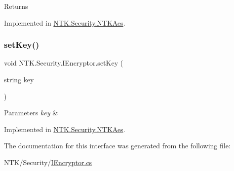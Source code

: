 \begin{DoxyReturn}{Returns}

\end{DoxyReturn}


Implemented in \mbox{\hyperlink{class_n_t_k_1_1_security_1_1_n_t_k_aes_a19ffab44349e954e69e9eb1831c9ceae}{N\+T\+K.\+Security.\+N\+T\+K\+Aes}}.

\mbox{\label{interface_n_t_k_1_1_security_1_1_i_encryptor_af4535102ef70526422662857b557971e}} 
\subsubsection{\texorpdfstring{setKey()}{setKey()}}
{\footnotesize\ttfamily void N\+T\+K.\+Security.\+I\+Encryptor.\+set\+Key (\begin{DoxyParamCaption}\item[{string}]{key }\end{DoxyParamCaption})}






\begin{DoxyParams}{Parameters}
{\em key} & \\
\hline
\end{DoxyParams}


Implemented in \mbox{\hyperlink{class_n_t_k_1_1_security_1_1_n_t_k_aes_aca17757ef38bf30e088c1b2a2d4f4478}{N\+T\+K.\+Security.\+N\+T\+K\+Aes}}.



The documentation for this interface was generated from the following file\+:\begin{DoxyCompactItemize}
\item 
N\+T\+K/\+Security/\mbox{\hyperlink{_i_encryptor_8cs}{I\+Encryptor.\+cs}}\end{DoxyCompactItemize}
